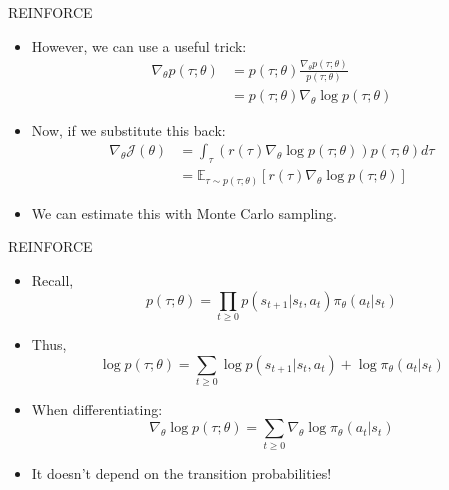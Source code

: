 \begin{frame}{REINFORCE}
\begin{itemize}
    \item However, we can use a useful trick:
    \begin{equation*}
    \begin{split}
        \nabla_\theta p(\tau;\theta) & = p(\tau;\theta) \frac{\nabla_\theta p(\tau;\theta)}{p(\tau;\theta)} \\
        & = p(\tau;\theta) \nabla_\theta \log p(\tau;\theta)
    \end{split}
    \end{equation*}
    \pause
    \item Now, if we substitute this back:
    \begin{equation*}
    \begin{split}
        \nabla_\theta \mathcal{J}(\theta) & = \int_\tau \left( r(\tau) \nabla_\theta \log p(\tau;\theta) \right) p(\tau;\theta) d\tau \\
        & = \mathbb{E}_{\tau \sim p(\tau;\theta)}\left[ r(\tau) \nabla_\theta \log p(\tau;\theta) \right]
    \end{split}
    \end{equation*}
    \item We can estimate this with Monte Carlo sampling.
\end{itemize}
\end{frame}

\begin{frame}{REINFORCE}
\begin{itemize}
    \item Recall,
    $$
    p(\tau;\theta) = \prod_{t \geq 0} p(s_{t+1}|s_t, a_t) \pi_\theta(a_t|s_t)
    $$
    \pause
    \item Thus,
    $$
    \log p(\tau;\theta) = \sum_{t \geq 0} \log p(s_{t+1}|s_t, a_t) + \log \pi_\theta(a_t|s_t)
    $$
    \pause
    \item When differentiating:
    $$
    \nabla_\theta \log p(\tau;\theta) = \sum_{t \geq 0} \nabla_\theta \log \pi_\theta(a_t|s_t)
    $$
    \pause
    \item It doesn’t depend on the transition probabilities!
\end{itemize}
\end{frame}


